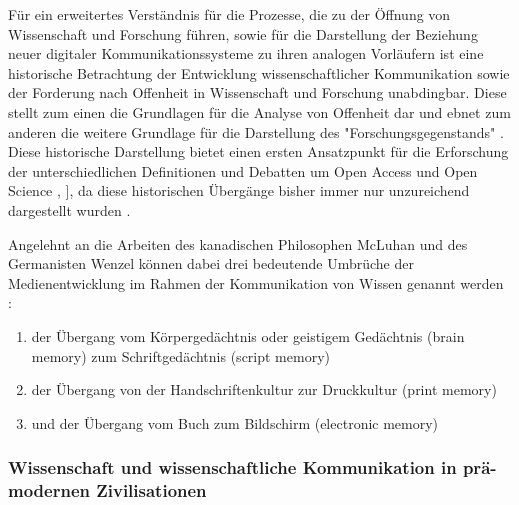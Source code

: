 Für ein erweitertes Verständnis für die Prozesse, die zu der Öffnung von Wissenschaft und Forschung führen, sowie für die Darstellung der Beziehung neuer digitaler Kommunikationssysteme zu ihren analogen Vorläufern ist eine historische Betrachtung der Entwicklung wissenschaftlicher Kommunikation sowie der Forderung nach Offenheit in Wissenschaft und Forschung unabdingbar. Diese stellt zum einen die Grundlagen für die Analyse von Offenheit dar und ebnet zum anderen die weitere Grundlage für die Darstellung des "Forschungsgegenstands" \cite{cite:10}. Diese historische Darstellung bietet einen ersten Ansatzpunkt für die Erforschung der unterschiedlichen Definitionen und Debatten um Open Access und Open Science \cite{Scheliga_2014}, ], da diese historischen Übergänge bisher immer nur unzureichend dargestellt wurden \cite{CREATe_2014}.

Angelehnt an die Arbeiten des kanadischen Philosophen McLuhan und des Germanisten Wenzel können dabei drei bedeutende Umbrüche der Medienentwicklung im Rahmen der Kommunikation von Wissen genannt werden \cite{wunderlich_2008_buchdruck} \cite{wenzel_mediengeschichte_2007}:
\begin{enumerate}
\item der Übergang vom Körpergedächtnis oder geistigem Gedächtnis (brain memory) zum Schriftgedächtnis (script memory)
\item der Übergang von der Handschriftenkultur zur Druckkultur (print memory)
\item und der Übergang vom Buch zum Bildschirm (electronic memory)
\end{enumerate}

\subsubsection{Wissenschaft und wissenschaftliche Kommunikation in prä-modernen Zivilisationen}

